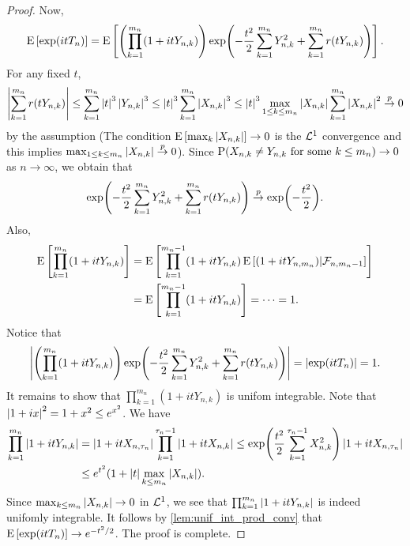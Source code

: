 \begin{proof}
    Now, 
    \begin{equation*}
        \E\sbrc{\exp\pth{itT_n}} = \E\sbrc{\pth{\prod_{k=1}^{m_n}(1+itY_{n,k})}\exp\pth{-\frac{t^2}{2}\sum_{k=1}^{m_n}Y_{n,k}^2 + \sum_{k=1}^{m_n}r(tY_{n,k})}}.
    \end{equation*}
    For any fixed $t$, 
    \begin{equation*}
        \abs{\sum_{k=1}^{m_n}r(tY_{n,k})}\leq \sum_{k=1}^{m_n}\abs{t}^3\abs{Y_{n,k}}^3
        \leq \abs{t}^3\sum_{k=1}^{m_n}\abs{X_{n,k}}^3
        \leq \abs{t}^3\max_{1\leq k\leq m_n}\abs{X_{n,k}}\sum_{k=1}^{m_n}\abs{X_{n,k}}^2\pto 0 
    \end{equation*}
    by the assumption (The condition $\E\sbrc{\max_{k}\abs{X_{n,k}}}\to 0$ is 
    the $\L^1$ convergence and this implies $\max_{1\leq k\leq m_n}\abs{X_{n,k}}\pto 0$). 
    Since $\P(X_{n,k}\neq Y_{n,k}\text{ for some $k\leq m_n$})\to 0$ as $n\to\infty$, 
    we obtain that 
    \begin{equation*}
        \exp\pth{-\frac{t^2}{2}\sum_{k=1}^{m_n}Y_{n,k}^2 + \sum_{k=1}^{m_n}r(tY_{n,k})}\pto \exp\pth{-\frac{t^2}{2}}.
    \end{equation*}
    Also, 
    \begin{equation*}
        \begin{split}
            \E\sbrc{\prod_{k=1}^{m_n}(1+itY_{n,k})} &= \E\sbrc{\prod_{k=1}^{m_n-1}(1+itY_{n,k})\E\sbrc{(1+itY_{n,m_n})|\F_{n,m_n-1}}} \\
            &= \E\sbrc{\prod_{k=1}^{m_n-1}(1+itY_{n,k})} = \cdots = 1. 
        \end{split}
    \end{equation*}
    Notice that 
    \begin{equation*}
        \abs{\pth{\prod_{k=1}^{m_n}(1+itY_{n,k})}\exp\pth{-\frac{t^2}{2}\sum_{k=1}^{m_n}Y_{n,k}^2 + \sum_{k=1}^{m_n}r(tY_{n,k})}} = \abs{\exp(itT_n)} = 1. 
    \end{equation*}
    It remains to show that $\prod_{k=1}^{m_n}(1+itY_{n,k})$ is unifom integrable. 
    Note that $\abs{1+ix}^2 = 1+x^2\leq e^{x^2}$. We have 
    \begin{equation*}
        \begin{split}
            \prod_{k=1}^{m_n}\abs{1+itY_{n,k}} &= \abs{1+itX_{n,\tau_n}}\prod_{k=1}^{\tau_n-1}\abs{1+itX_{n,k}} 
            \leq \exp\pth{\frac{t^2}{2}\sum_{k=1}^{\tau_n-1}X_{n,k}^2}\abs{1+itX_{n,\tau_n}} \\
            &\leq e^{t^2}(1+\abs{t}\max_{k\leq m_n}\abs{X_{n,k}}).
        \end{split}
    \end{equation*}
    Since $\max_{k\leq m_n}\abs{X_{n,k}}\to 0$ in $\L^1$, we see that 
    $\prod_{k=1}^{m_n}\abs{1+itY_{n,k}}$ is indeed unifomly integrable. 
    It follows by \cref{lem:unif_int_prod_conv} that $\E\sbrc{\exp\pth{itT_n}} 
    \to e^{-t^2/2}$. The proof is complete. 
\end{proof}